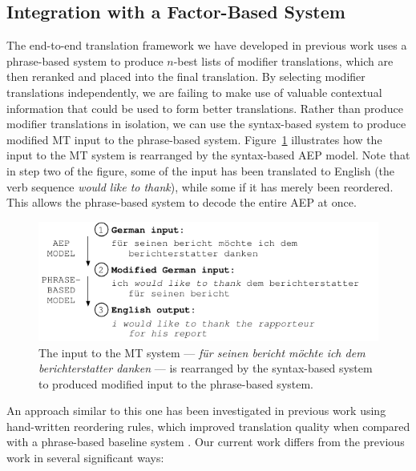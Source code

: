 \documentclass[11pt]{report}
\theoremstyle{plain}
\begin{document}
{\subsection{Integration with a Factor-Based System}
The end-to-end translation framework we have developed in previous
work uses a phrase-based system to produce $n$-best lists of modifier
translations, which are then reranked and placed into the final
translation. By selecting modifier translations independently, we are
failing to make use of valuable contextual information that could be
used to form better translations.  Rather than produce modifier
translations in isolation, we can use the syntax-based system to
produce modified MT input to the phrase-based
system. Figure~\ref{modifiedinput} illustrates how the input to the MT
system is rearranged by the syntax-based AEP model. Note that in step
two of the figure, some of the input has been translated to English
(the verb sequence {\em would like to thank}), while some if it has
merely been reordered. This allows the phrase-based system to decode
the entire AEP at once.

\begin{figure}
\begin{center}
\includegraphics[scale=1.2]{brooke-modifiedinput2}
\end{center}
\vspace{-0.5cm}
\caption{The input to the MT system --- {\em f\"{u}r seinen bericht
m\"{o}chte ich dem berichterstatter danken} --- is rearranged by the
syntax-based system to produced modified input to the phrase-based
system.}
\label{modifiedinput}
\end{figure}

An approach similar to this one has been investigated in previous work
using hand-written reordering rules, which improved translation
quality when compared with a phrase-based baseline system
. Our current work differs from the previous work in
several significant ways:

}
\end{document}
